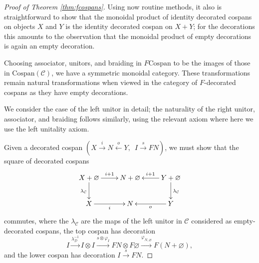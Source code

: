\begin{proof}[Proof of Theorem \ref{thm:fcospans}]
Using now routine methods, it also is straightforward to show that the monoidal
product of identity decorated cospans on objects $X$ and $Y$ is the identity
decorated cospan on $X+Y$; for the decorations this amounts to the observation
that the monoidal product of empty decorations is again an empty decoration.

Choosing associator, unitors, and braiding in $F\mathrm{Cospan}$ to be the
images of those in $\mathrm{Cospan(\mathcal{C})}$, we have a symmetric
monoidal category. These transformations remain natural transformations when
viewed in the category of $F$-decorated cospans as they have empty
decorations.

We consider the case of the left unitor in detail; the naturality of the right
unitor, associator, and braiding follows similarly, using the relevant axiom
where here we use the left unitality axiom. 

Given a decorated cospan $(X \stackrel{i}\longrightarrow N
\stackrel{o}\longleftarrow Y,\enspace I \stackrel{s}\longrightarrow FN)$, we
must show that the square of decorated cospans
\[
  \xymatrix{
    X+\varnothing \ar[r]^{i+1} \ar[d]_{\lambda_{\mathcal C}} & N+\varnothing & Y+\varnothing
    \ar[l]_{i+1} \ar[d]^{\lambda_{\mathcal C}} \\
    X \ar[r]_{i} & N & Y \ar[l]^{o} 
  }
\]
commutes, where the $\lambda_{\mathcal C}$ are the maps of the left unitor in
$\mathcal C$ considered as empty-decorated cospans, the top cospan has
decoration 
\[
  I \stackrel{\lambda^{-1}_{\mathcal D}}{\longrightarrow} I \otimes I \stackrel{s \otimes
  \varphi_I}\longrightarrow FN \otimes F\varnothing
  \stackrel{\varphi_{N,\varnothing}}\longrightarrow F(N+\varnothing),
\]
and the lower cospan has decoration $I \stackrel{s}{\longrightarrow} FN$. 


\end{proof}
